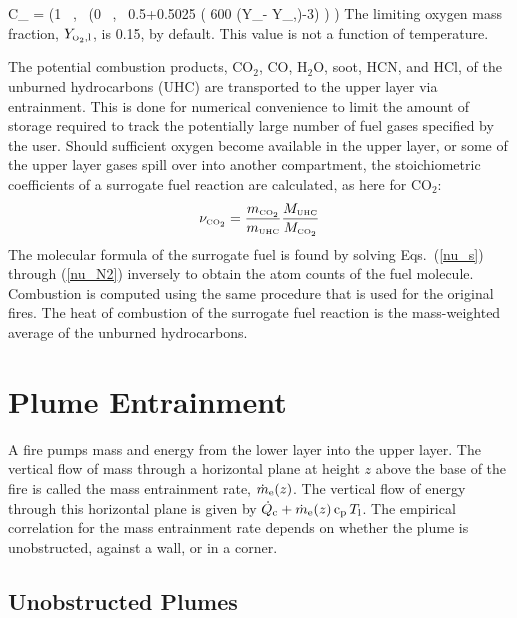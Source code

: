 \documentclass[12pt,twoside]{book}
\begin{document}
\be
   C_{} = \min \left(1 \, , \, \max \left(0 \, , \, 0.5+0.5025 \tanh \left( 600 \left(Y_\OTWO - Y_{\OTWO,{}}\right)-3\right)  \right) \right)
\ee
The limiting oxygen mass fraction, $Y_{{\scriptscriptstyle\mathrm{O\sb{2}}},{\mathrm{l}}}$, is 0.15, by default. This value is not a function of temperature.

The potential combustion products, CO$_2$, CO, H$_2$O, soot, HCN, and HCl, of the unburned hydrocarbons (UHC) are transported to the upper layer via entrainment. This is done for numerical convenience to limit the amount of storage required to track the potentially large number of fuel gases specified by the user. Should sufficient oxygen become available in the upper layer, or some of the upper layer gases spill over into another compartment, the stoichiometric coefficients of a surrogate fuel reaction are calculated, as here for CO$_2$:
\begin{equation}
   \nu_{\scriptscriptstyle\mathrm{CO\sb{2}}} = \frac{m_{\scriptscriptstyle\mathrm{CO\sb{2}}}}{m_{\scriptscriptstyle\mathrm{UHC}}} \frac{M_{\scriptscriptstyle\mathrm{UHC}}}{M_{\scriptscriptstyle\mathrm{CO\sb{2}}}}
\end{equation}
The molecular formula of the surrogate fuel is found by solving Eqs.~(\ref{nu_s}) through (\ref{nu_N2}) inversely to obtain the atom counts of the fuel molecule. Combustion is computed using the same procedure that is used for the original fires. The heat of combustion of the surrogate fuel reaction is the mass-weighted average of the unburned hydrocarbons.


\section{Plume Entrainment}

A fire pumps mass and energy from the lower layer into the upper layer. The vertical flow of mass through a horizontal plane at height $z$ above the base of the fire is called the mass entrainment rate, $\dot{m}\sb{\mathrm{e}}(z)$. The vertical flow of energy through this horizontal plane is given by $\dot{Q}_{\mathrm{c}} + \dot{m}\sb{\mathrm{e}}(z) \, {\mathrm{c}}\sb{\mathrm{p}} \, T\sb{\mathrm{l}}$. The empirical correlation for the mass entrainment rate depends on whether the plume is unobstructed, against a wall, or in a corner.

\subsection{Unobstructed Plumes}
\end{document}
